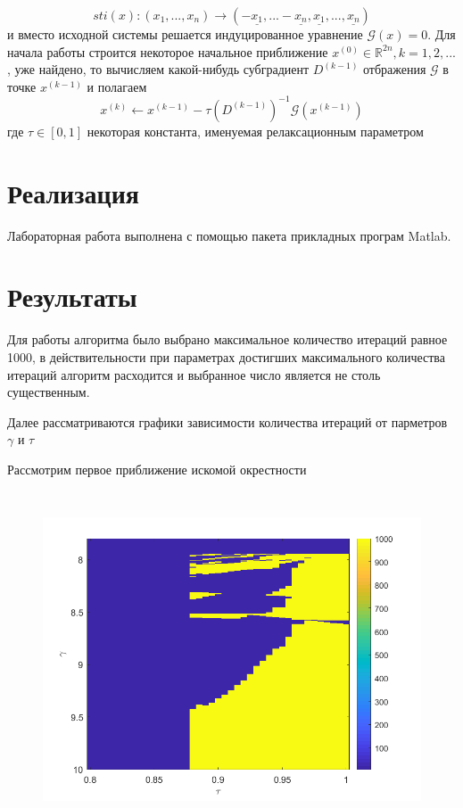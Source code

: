 \documentclass[12pt,a4paper]{scrartcl}
\begin{document}
\begin{equation}
sti(x) : (x_1, ..., x_n) \rightarrow (-\underline{x_1}, ... -\underline{x_n}, \underline{x_1}, ..., \underline{x_n})
\end{equation}
и вместо исходной системы решается индуцированное уравнение $\mathcal{G}(x) = 0$. Для начала работы строится некоторое начальное приближение $x^{(0)} \in \mathds{R}^{2n}, k=1,2,...$, уже найдено, то вычисляем какой-нибудь субградиент $D^{(k-1)}$ отбражения $\mathcal{G}$ в точке $x^{(k-1)}$ и полагаем 
\begin{equation}
x^{(k)} \leftarrow x^{(k-1)} - \tau(D^{(k-1)})^{-1}\mathcal{G}(x^{(k-1)})
\end{equation}
где $\tau \in [0, 1]$ некоторая константа, именуемая релаксационным параметром

\section {Реализация}

Лабораторная работа выполнена с помощью пакета прикладных програм Matlab.

\section{Результаты}

Для работы алгоритма было выбрано максимальное количество итераций равное 1000, в действительности при параметрах достигших максимального количества итераций алгоритм расходится и выбранное число является не столь существенным.

Далее рассматриваются графики зависимости количества итераций от парметров $\gamma$ и $\tau$

Рассмотрим первое приближение искомой окрестности

\begin{figure}[H]
    \centering
    \includegraphics[width=14cm, height=10cm]{fig/1.png}
\end{figure}
\end{document}

